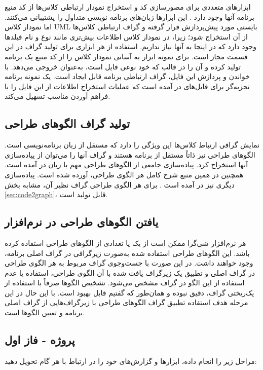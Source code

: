 \documentclass[a4paper,12pt]{article}
\begin{document}
ابزارهای متعددی برای مصورسازی کد و استخراج نمودار ارتباطی کلاس‌ها از کد منبع برنامه آنها وجود دارد 
\cite{EA2020,VP2020,Understand2020}.
این ابزارها زبان‌های برنامه نویسی متداول را پشتیبانی می‌کنند. اما نمودار کلاس UML بایستی مورد پیش‌پردازش قرار گرفته و گراف ارتباطی کلاس‌ها از آن استخراج شود؛ زیرا، در نمودار کلاس اطلاعات بیش‌تری مانند نوع و نام فیلد‌ها وجود دارد که در اینجا به آنها نیاز نداریم. 
استفاده از هر ابزاری برای تولید گراف در این قسمت مجاز است.
برای نمونه ابزار 
 \cite{EA2020}
به آسانی نمودار کلاس را از کد منبع یک برنامه تولید کرده و آن را در قالب 
که خود نوعی فایل  است، به‌عنوان خروجی می‌دهد. با خواندن و پردازش این فایل، گراف ارتباطی برنامه قابل ایجاد است. یک نمونه برنامه تجزیه‌گر برای فایل‌های  در 
\cite{XMI2020}
 آمده است که عملیات استخراج اطلاعات از این فایل را با فراهم آوردن  مناسب تسهیل می‌کند. 


\subsection{تولید گراف ‌الگوهای طراحی}
نمایش گرافی ارتباط کلاس‌ها این ویژگی‌ را دارد که مستقل از زبان برنامه‌نویسی است. الگوهای طراحی نیز ذاتاً مستقل از برنامه هستند و گراف آنها را می‌توان از پیاده‌سازی آنها استخراج کرد. پیاده‌سازی جامعی از الگوهای طراحی مهم با زبان  در 
\cite{RefactoringGuru2020}
آمده است. همچنین در همین منبع شرح کامل هر الگوی طراحی، آورده شده است. پیاده‌سازی دیگری نیز در آمده است
\cite{Wikibooks2020}. 
برای هر الگوی طراحی گراف نظیر آن، مشابه بخش \ref{sec:code2graph}، قابل تولید است.


\subsection{یافتن الگوهای طراحی در نرم‌افزار}
هر نرم‌افزار شی‌گرا ممکن است از یک یا تعدادی از الگو‌های طراحی استفاده کرده باشد. این الگوهای طراحی استفاده شده به‌صورت زیرگرافی در گراف اصلی برنامه، وجود خواهند داشت.
 در این صورت با جست‌وجوی گراف مربوط به هر الگوی طراحی در گراف اصلی و تطبیق یک زیرگراف یافت شده با آن الگوی طراحی، استفاده یا عدم استفاده از این الگو در گراف مشخص می‌شود. تشخیص الگوها صرفاً با استفاده از یک‌ریختی گراف، دقیق نبوده و همان‌طور که گفتیم قابل بهبود است. با این حال در این مرحله هدف استفاده تطبیق گراف الگوهای طراحی با زیرگراف‌هایی از گراف اصلی برنامه و تعیین الگوها است.
 
 
 \subsection{پروژه - فاز اول}
مراحل زیر را انجام داده، ابزارها و گزارش‌های خود را در ارتباط با هر گام تحویل دهید:
\end{document}
